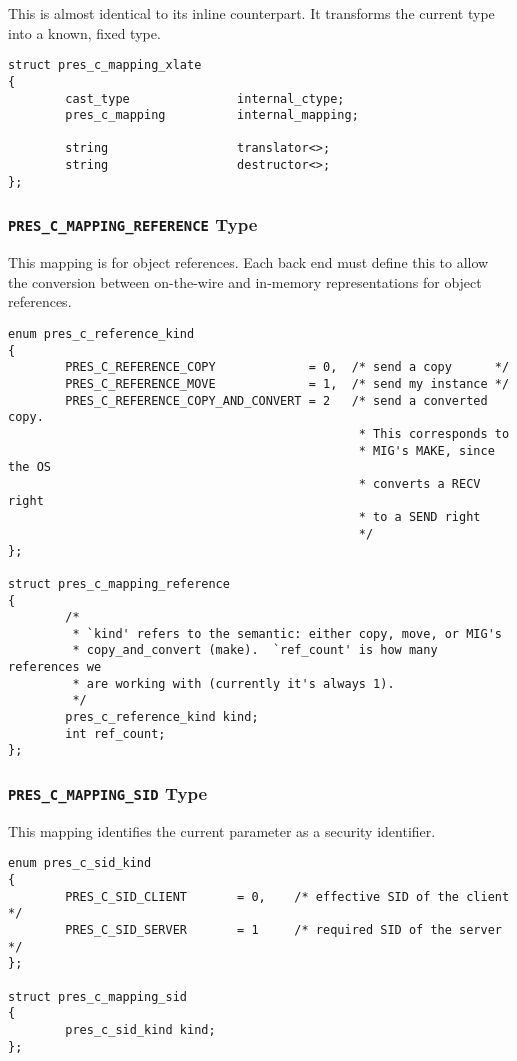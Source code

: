 This is almost identical to its inline counterpart.  It transforms the current
\CAST{} type into a known, fixed type.

\begin{verbatim}
struct pres_c_mapping_xlate
{
        cast_type               internal_ctype;
        pres_c_mapping          internal_mapping;

        string                  translator<>;
        string                  destructor<>;
};
\end{verbatim}

\subsubsection{\texttt{PRES\_C\_MAPPING\_REFERENCE} Type}

This mapping is for object references.  Each back end must define this to allow
the conversion between on-the-wire and in-memory representations for object
references.

\begin{verbatim}
enum pres_c_reference_kind
{
        PRES_C_REFERENCE_COPY             = 0,  /* send a copy      */
        PRES_C_REFERENCE_MOVE             = 1,  /* send my instance */
        PRES_C_REFERENCE_COPY_AND_CONVERT = 2   /* send a converted copy.
                                                 * This corresponds to 
                                                 * MIG's MAKE, since the OS
                                                 * converts a RECV right
                                                 * to a SEND right
                                                 */
};

struct pres_c_mapping_reference
{
        /* 
         * `kind' refers to the semantic: either copy, move, or MIG's
         * copy_and_convert (make).  `ref_count' is how many references we
         * are working with (currently it's always 1).
         */             
        pres_c_reference_kind kind; 
        int ref_count;
};
\end{verbatim}

\subsubsection{\texttt{PRES\_C\_MAPPING\_SID} Type}

This mapping identifies the current parameter as a security identifier.

\begin{verbatim}
enum pres_c_sid_kind
{
        PRES_C_SID_CLIENT       = 0,    /* effective SID of the client */
        PRES_C_SID_SERVER       = 1     /* required SID of the server  */
};

struct pres_c_mapping_sid
{
        pres_c_sid_kind kind;
};
\end{verbatim}

